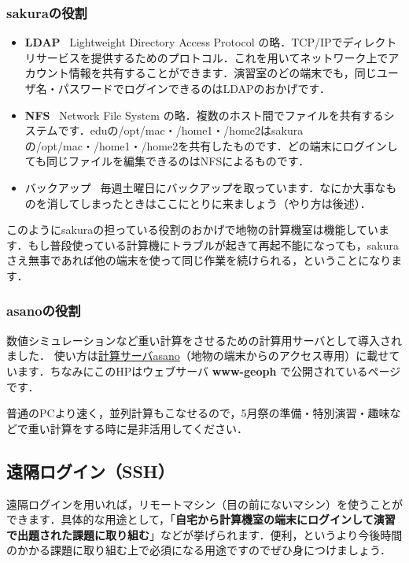 \documentclass{jarticle}
\begin{document}
\subsubsection{sakuraの役割}
\begin{itemize}
\item {\bf LDAP} \ 
Lightweight Directory Access Protocol の略．TCP/IPでディレクトリサービスを提供するためのプロトコル．これを用いてネットワーク上でアカウント情報を共有することができます．演習室のどの端末でも，同じユーザ名・パスワードでログインできるのはLDAPのおかげです．

\item {\bf NFS} \ 
Network File System の略．複数のホスト間でファイルを共有するシステムです．eduの/opt/mac・/home1・/home2はsakuraの/opt/mac・/home1・/home2を共有したものです．どの端末にログインしても同じファイルを編集できるのはNFSによるものです．

\item バックアップ \ 
毎週土曜日にバックアップを取っています．なにか大事なものを消してしまったときはここにとりに来ましょう（やり方は後述）．
\end{itemize}

このようにsakuraの担っている役割のおかげで地物の計算機室は機能しています．もし普段使っている計算機にトラブルが起きて再起不能になっても，sakuraさえ無事であれば他の端末を使って同じ作業を続けられる，ということになります．

\subsubsection{asanoの役割}
数値シミュレーションなど重い計算をさせるための計算用サーバとして導入されました．
使い方は\href{http://www-geoph.eps.s.u-tokyo.ac.jp/~s162633/epp_computers/index.php?asano}{計算サーバasano}（地物の端末からのアクセス専用）に載せています．ちなみにこのHPはウェブサーバ {\bf www-geoph} で公開されているページです．

普通のPCより速く，並列計算もこなせるので，5月祭の準備・特別演習・趣味などで重い計算をする時に是非活用してください．


\subsection{遠隔ログイン（SSH）}
遠隔ログインを用いれば，リモートマシン（目の前にないマシン）を使うことができます．具体的な用途として，「{\bf 自宅から計算機室の端末にログインして演習で出題された課題に取り組む}」などが挙げられます．便利，というより今後時間のかかる課題に取り組む上で必須になる用途ですのでぜひ身につけましょう．
 
\end{document}
